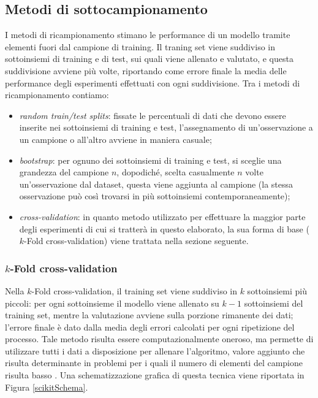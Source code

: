 \documentclass[12pt,a4paper]{report}
\begin{document}
\subsection{Metodi di sottocampionamento}

I metodi di ricampionamento stimano le performance di un modello tramite elementi fuori dal campione di training.
Il traning set viene suddiviso in sottoinsiemi di training e di test, sui quali viene allenato e valutato, e questa suddivisione avviene più volte, riportando come errore finale la media delle performance degli esperimenti effettuati con ogni suddivisione.
Tra i metodi di ricampionamento contiamo:

\begin{itemize}
\item{\emph{random train/test splits}}: fissate le percentuali di dati che devono essere inserite nei sottoinsiemi di training e test,  l'assegnamento di un'osservazione a un campione o all'altro avviene in maniera casuale;
\item{\emph{bootstrap}}: per ognuno dei sottoinsiemi di training e test, si sceglie una grandezza del campione $n$, dopodiché,  scelta casualmente $n$ volte un'osservazione dal dataset, questa viene aggiunta al campione (la stessa osservazione può così trovarsi in più sottoinsiemi contemporaneamente); 
\item{\emph{cross-validation}}: in quanto metodo utilizzato per effettuare la maggior parte degli esperimenti di cui si tratterà in questo elaborato, la sua forma di base ($k$-Fold cross-validation) viene trattata nella sezione seguente.
\end{itemize}

\subsubsection{$k$-Fold cross-validation}
Nella $k$-Fold cross-validation, il training set viene suddiviso in $k$ sottoinsiemi più piccoli: per ogni sottoinsieme il modello viene allenato su $k - 1$ sottoinsiemi del training set, mentre la valutazione avviene sulla porzione rimanente dei dati; l'errore finale è dato dalla media degli errori calcolati per ogni ripetizione del processo.
Tale metodo risulta essere computazionalmente oneroso, ma permette di utilizzare tutti i dati a disposizione per allenare l'algoritmo, valore aggiunto che risulta determinante in problemi per i quali il numero di elementi del campione risulta basso \cite{scikit-learn}. Una schematizzazione grafica di questa tecnica viene riportata in Figura \ref{scikitSchema}.
\end{document}
